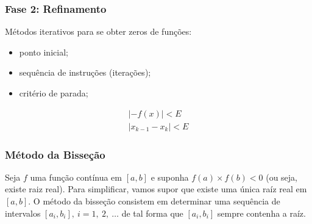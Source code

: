 \documentclass{article}
\begin{document}
        \subsubsection{Fase 2: Refinamento}
        Métodos iterativos para se obter zeros de funções:
        \begin{itemize}
            \item ponto inicial;
            \item sequência de instruções (iterações);
            \item critério de parada;
        \end{itemize}

        \begin{gather*}
            |-f(x)| < E\\
            |x_{k-1} - x_k| < E
        \end{gather*}

        \subsubsection{Método da Bisseção}
        Seja $f$ uma função contínua em $[a,b]$ e suponha $f(a) \times f(b) < 0$ (ou seja, existe raiz real). Para simplificar, vamos supor que existe uma única raíz real em $[a,b]$. O método da bisseção consistem em determinar uma sequência de intervalos $[a_i,b_i],~i = 1,~2,~\ldots$ de tal forma que $[a_i,b_i]$ sempre contenha a raíz.
\end{document}
